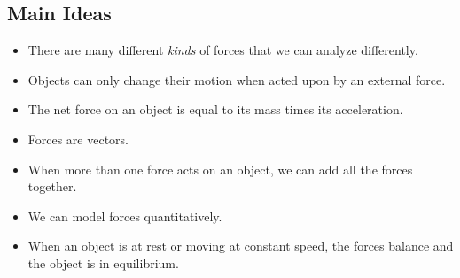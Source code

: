 \documentclass[]{article}
\begin{document}
\newpage
\begin{TeacherMargin}
	
\end{TeacherMargin}
\begin{PresentSpace}
\section*{Main Ideas}
\begin{itemize}
	\item There are many different \textit{kinds} of forces that we can analyze differently.
	\item Objects can only change their motion when acted upon by an external force.
	\item The net force on an object is equal to its mass times its acceleration.
	\item Forces are vectors.
	\item When more than one force acts on an object, we can add all the forces together.
	\item We can model forces quantitatively.
	\item When an object is at rest or moving at constant speed, the forces balance and the object is in equilibrium.
\end{itemize}
\end{PresentSpace}
\end{document}
